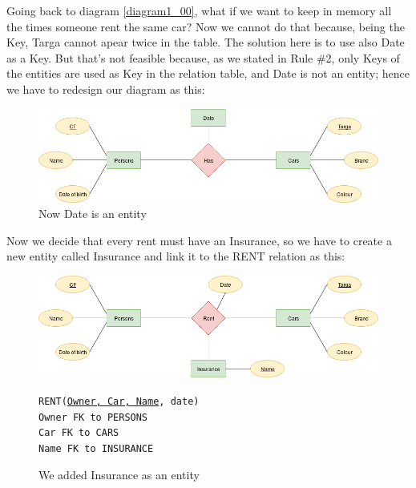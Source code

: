 \documentclass[class=book, crop=false, oneside]{standalone}
\newcommand\tab[1][1cm]{\hspace*{#1}}
\begin{document}
Going back to diagram \ref{diagram1_00}, what if we want to keep in memory all the times someone rent the same car?
Now we cannot do that because, being the Key, Targa cannot apear twice in the table.
The solution here is to use also Date as a Key.
But that's not feasible because, as we stated in Rule \#2, only Keys of the entities are used as Key in the relation table, and Date is not an entity; hence we have to redesign our diagram as this:
\begin{figure}[H]
	\includegraphics[width=\textwidth,keepaspectratio]{diagram1_03.png}
	\caption{Now Date is an entity}
	\label{diagram1_03}
\end{figure}
\vskip 20pt

Now we decide that every rent must have an Insurance, so we have to create a new entity called Insurance and link it to the RENT relation as this:
\begin{figure}[H]
	\includegraphics[width=\textwidth,keepaspectratio]{diagram1_04.png}
	\caption{We added Insurance as an entity}
	\texttt{RENT(\underline{Owner, Car, Name}, date)}\\
		\tab[.8cm] \texttt{Owner FK to PERSONS}\\
		\tab[.8cm] \texttt{Car FK to CARS}\\
		\tab[.8cm] \texttt{Name FK to INSURANCE}
	\label{diagram1_04}
\end{figure}
\vskip 20pt
\end{document}
